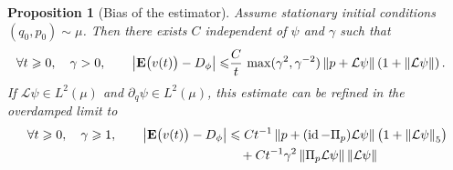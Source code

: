 \documentclass[11pt,a4paper]{article}
\DeclareMathOperator{\id}{id}
\newcommand{\expect}[0]{\mathbf{E}}
\theoremstyle{plain}
\newtheorem{proposition}{Proposition}[section]
\numberwithin{equation}{section}
\renewcommand{\leq}{\leqslant}
\renewcommand{\geq}{\geqslant}
\begin{document}
\begin{proposition}
    [Bias of the estimator]
    Assume stationary initial conditions~$(q_0, p_0) \sim \mu$.
    Then there exists $C$ independent of $\psi$ and $\gamma$ such that
    \begin{align}
        \label{eq:basic_bound_bias}
        \forall t \geq 0, \quad \gamma > 0, \qquad
        \abs{\expect \bigl( v(t) \bigr) - D_{\phi}}
        \leq &\frac{C}{t} \, \max(\gamma^2, \gamma^{-2}) \norm{p + \mathcal L\psi}  \left(1 + \norm{\mathcal L \psi} \right).
    \end{align}
    If $\mathcal L \psi \in L^2(\mu)$ and $\partial_q \mathcal \psi \in L^2(\mu)$,
    this estimate can be refined in the overdamped limit to
    \begin{align*}
        \forall t \geq 0, \quad \gamma \geq 1, \qquad
        \abs{\expect \bigl( v(t) \bigr) - D_{\phi}}
        &\leq C t^{-1}
            \norm{p + (\id - \Pi_p) \mathcal L \psi} \bigl(1 + \norm{\mathcal L \psi}[5] \bigr) \\
             &\quad + C t^{-1} \gamma^2 \norm{\Pi_p \mathcal L \psi} \norm{\mathcal L \psi}
    \end{align*}
\end{proposition}
\end{document}
